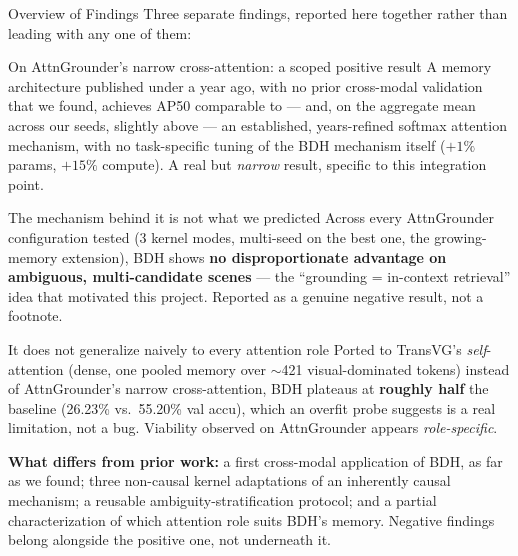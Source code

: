 \documentclass[aspectratio=169]{beamer}
\begin{document}
\begin{frame}{Overview of Findings}
  \tiny Three separate findings, reported here together rather than
  leading with any one of them:
  \vspace{-0.1cm}
  \begin{block}{On AttnGrounder's narrow cross-attention: a scoped positive result}
    \tiny A memory architecture published under a year ago, with no
    prior cross-modal validation that we found, achieves AP50
    comparable to — and, on the aggregate mean across our seeds,
    slightly above — an established, years-refined softmax attention
    mechanism, with no task-specific tuning of the BDH mechanism itself
    ($+1\%$ params, $+15\%$ compute). A real but \emph{narrow} result,
    specific to this integration point.
  \end{block}
  \vspace{-0.15cm}
  \begin{alertblock}{The mechanism behind it is not what we predicted}
    \tiny Across every AttnGrounder configuration tested (3 kernel
    modes, multi-seed on the best one, the growing-memory extension),
    BDH shows \textbf{no disproportionate advantage on ambiguous,
    multi-candidate scenes} — the ``grounding = in-context retrieval''
    idea that motivated this project. Reported as a genuine negative
    result, not a footnote.
  \end{alertblock}
  \vspace{-0.15cm}
  \begin{alertblock}{It does not generalize naively to every attention role}
    \tiny Ported to TransVG's \emph{self}-attention (dense, one pooled
    memory over $\sim$421 visual-dominated tokens) instead of
    AttnGrounder's narrow cross-attention, BDH plateaus at
    \textbf{roughly half} the baseline (26.23\% vs.\ 55.20\% val accu),
    which an overfit probe suggests is a real limitation, not a bug.
    Viability observed on AttnGrounder appears \emph{role-specific}.
  \end{alertblock}
  \vspace{0.05cm}
  \tiny\textbf{What differs from prior work:} a first cross-modal
  application of BDH, as far as we found; three non-causal kernel
  adaptations of an inherently causal mechanism; a reusable
  ambiguity-stratification protocol; and a partial characterization of
  which attention role suits BDH's memory. Negative findings belong
  alongside the positive one, not underneath it.
\end{frame}
\end{document}
